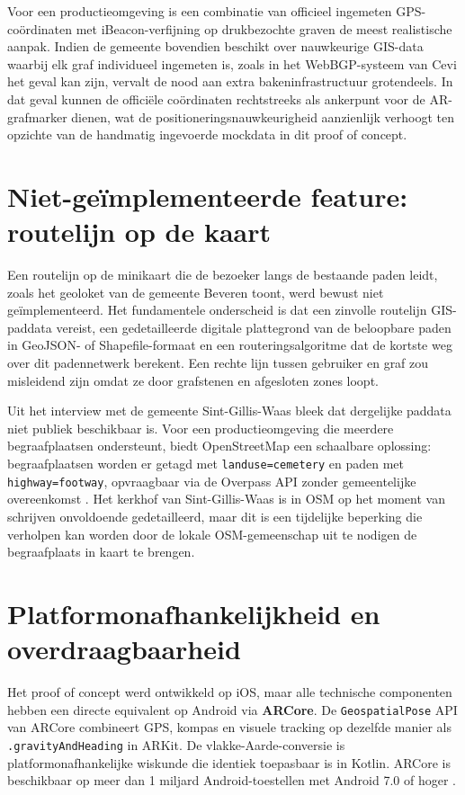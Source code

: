 Voor een productieomgeving is een combinatie van officieel ingemeten
GPS-coördinaten met iBeacon-verfijning op drukbezochte graven de meest
realistische aanpak. Indien de gemeente bovendien beschikt over nauwkeurige
GIS-data waarbij elk graf individueel ingemeten is, zoals in het WebBGP-systeem
van Cevi het geval kan zijn, vervalt de nood aan extra bakeninfrastructuur
grotendeels. In dat geval kunnen de officiële coördinaten rechtstreeks als
ankerpunt voor de AR-grafmarker dienen, wat de positioneringsnauwkeurigheid
aanzienlijk verhoogt ten opzichte van de handmatig ingevoerde mockdata in
dit proof of concept.

\section{Niet-geïmplementeerde feature: routelijn op de kaart}
\label{sec:routelijn}

Een routelijn op de minikaart die de bezoeker langs de bestaande paden leidt, zoals het geoloket van de gemeente Beveren toont, werd bewust niet geïmplementeerd. Het fundamentele onderscheid is dat een zinvolle routelijn GIS-paddata vereist, een gedetailleerde digitale plattegrond van de beloopbare paden in GeoJSON- of Shapefile-formaat en een routeringsalgoritme dat de kortste weg over dit padennetwerk berekent. Een rechte lijn tussen gebruiker en graf zou misleidend zijn omdat ze door grafstenen en afgesloten zones loopt.

Uit het interview met de gemeente Sint-Gillis-Waas bleek dat dergelijke paddata niet publiek beschikbaar is. Voor een productieomgeving die meerdere begraafplaatsen ondersteunt, biedt OpenStreetMap een schaalbare oplossing: begraafplaatsen worden er getagd met \texttt{landuse=cemetery} en paden met \texttt{highway=footway}, opvraagbaar via de Overpass API zonder gemeentelijke overeenkomst \autocite{Novack2018}. Het kerkhof van Sint-Gillis-Waas is in OSM op het moment van schrijven onvoldoende gedetailleerd, maar dit is een tijdelijke beperking die verholpen kan worden door de lokale OSM-gemeenschap uit te nodigen de begraafplaats in kaart te brengen.

\section{Platformonafhankelijkheid en overdraagbaarheid}
\label{sec:platform}

Het proof of concept werd ontwikkeld op iOS, maar alle technische componenten hebben een directe equivalent op Android via \textbf{ARCore}. De \texttt{GeospatialPose} API van ARCore combineert GPS, kompas en visuele tracking op dezelfde manier als \texttt{.gravityAndHeading} in ARKit. De vlakke-Aarde-conversie is platformonafhankelijke wiskunde die identiek toepasbaar is in Kotlin. ARCore is beschikbaar op meer dan 1 miljard Android-toestellen met Android 7.0 of hoger \autocite{GoogleARCore2024}.

